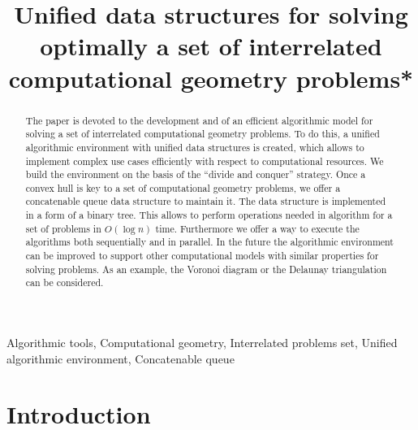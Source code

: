 \documentclass[conference]{IEEEtran}
\theoremstyle{plane}
\begin{document}
\title{Unified data structures for solving optimally a set of interrelated computational geometry problems*}
\author{
\and
{}
}
\maketitle

\begin{abstract}
		The paper is devoted to the development and  of an efficient algorithmic model for solving a set of interrelated computational geometry problems. To do this, a unified algorithmic environment with unified data structures is created, which allows to implement complex use cases efficiently with respect to computational resources. We build the environment on the basis of the ``divide and conquer'' strategy. 
		Once a convex hull is key to a set of computational geometry problems, we offer a concatenable queue data structure to maintain it. The data structure is implemented in a form of a binary tree. This allows to perform operations needed in algorithm for a set of problems in $O(\log n)$ time. Furthermore we offer a way to execute the algorithms both sequentially and in parallel.
		In the future the algorithmic environment can be improved to support other computational models with similar properties for solving problems. As an example, the Voronoi diagram or the Delaunay triangulation can be considered.
\end{abstract}

\begin{IEEEkeywords}
Algorithmic tools,   Computational geometry, Interrelated problems set, Unified algorithmic environment, Concatenable queue
\end{IEEEkeywords}

\section{Introduction}
		
\end{document}
